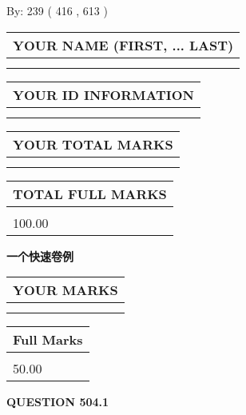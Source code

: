 \documentclass{ctexart}
\begin{document}
   
\hspace{1.0in} By: 
 239 ( 416 ,  613 )
   
   
   
   
\newpage 
\setcounter{page}{ 
   504001 } 
   
   
   
   
\noindent\begin{tabular}{|l|}
\hline
YOUR NAME (FIRST, ... LAST)  \\
\hline
 \\ 
 \\ 
\hline
\end{tabular}
\hspace{0.05in} \begin{tabular}{|l|}
\hline
 YOUR   ID   INFORMATION  \\
\hline
 \\ 
 \\ 
\hline
\end{tabular}
   
   
\vspace{0.2in}\noindent\begin{tabular}{|l|}
\hline
YOUR TOTAL MARKS  \\
\hline
 \\ 
 \\ 
\hline
\end{tabular}
\hspace{0.05in} \begin{tabular}{|l|}
\hline
TOTAL FULL MARKS  \\
\hline
 \\ 
100.00 \\
\hline
\end{tabular}
   
   
 \vspace{0.2in}
{\LARGE {\textbf{ 一个快速卷例}}}
   
   
  
\vspace{0.2in}
  
\noindent\begin{tabular}{|l|}
\hline
 YOUR MARKS  \\
\hline
 \\ 
 \\ 
\hline
\end{tabular}
\hspace{0.05in} \begin{tabular}{|l|}
\hline
 Full Marks  \\
\hline
 \\ 
50.00 \\
\hline
\end{tabular}
{\textbf{\Large{QUESTION
504.1 
}}}
  
\end{document}
